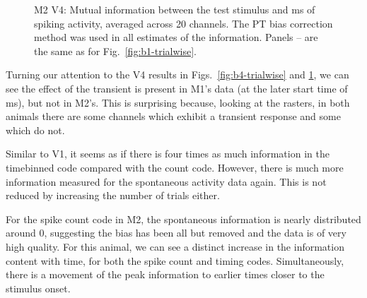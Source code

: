 \begin{figure}[htbp]
\begin{subfigure}[b]{0.5\linewidth}
    \end{subfigure}
    \caption{M2 V4: Mutual information between the test stimulus and \unit[20]{ms} of spiking activity, averaged across 20 channels.
The PT bias correction method was used in all estimates of the information.
Panels -- are the same as for Fig.~\ref{fig:b1-trialwise}.
}
    \label{fig:j4-trialwise}
\end{figure}



Turning our attention to the V4 results in Figs.~\ref{fig:b4-trialwise} and \ref{fig:j4-trialwise}, we can see the effect of the transient is present in M1's data (at the later start time of \unit[75]{ms}), but not in M2's. This is surprising because, looking at the rasters, in both animals there are some channels which exhibit a transient response and some which do not.

Similar to V1, it seems as if there is four times as much information in the timebinned code compared with the count code. However, there is much more information measured for the spontaneous activity data again. This is not reduced by increasing the number of trials either.

For the spike count code in M2, the spontaneous information is nearly distributed around 0, suggesting the bias has been all but removed and the data is of very high quality. For this animal, we can see a distinct increase in the information content with time, for both the spike count and timing codes. Simultaneously, there is a movement of the peak information to earlier times closer to the stimulus onset.

